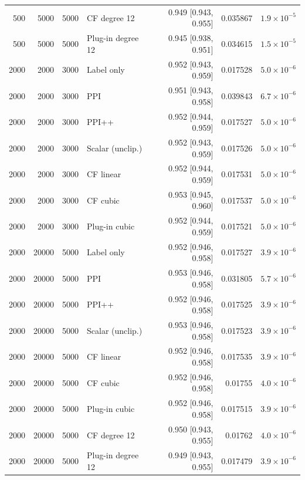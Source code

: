 {\begin{longtable}{rrrlrrr}
500 & 5000 & 5000 & CF degree 12 & 0.949 [0.943, 0.955] & 0.035867 & $1.9\times 10^{-5}$ \\
500 & 5000 & 5000 & Plug-in degree 12 & 0.945 [0.938, 0.951] & 0.034615 & $1.5\times 10^{-5}$ \\
2000 & 2000 & 3000 & Label only & 0.952 [0.943, 0.959] & 0.017528 & $5.0\times 10^{-6}$ \\
2000 & 2000 & 3000 & PPI & 0.951 [0.943, 0.958] & 0.039843 & $6.7\times 10^{-6}$ \\
2000 & 2000 & 3000 & PPI++ & 0.952 [0.944, 0.959] & 0.017527 & $5.0\times 10^{-6}$ \\
2000 & 2000 & 3000 & Scalar (unclip.) & 0.952 [0.943, 0.959] & 0.017526 & $5.0\times 10^{-6}$ \\
2000 & 2000 & 3000 & CF linear & 0.952 [0.944, 0.959] & 0.017531 & $5.0\times 10^{-6}$ \\
2000 & 2000 & 3000 & CF cubic & 0.953 [0.945, 0.960] & 0.017537 & $5.0\times 10^{-6}$ \\
2000 & 2000 & 3000 & Plug-in cubic & 0.952 [0.944, 0.959] & 0.017521 & $5.0\times 10^{-6}$ \\
2000 & 20000 & 5000 & Label only & 0.952 [0.946, 0.958] & 0.017527 & $3.9\times 10^{-6}$ \\
2000 & 20000 & 5000 & PPI & 0.953 [0.946, 0.958] & 0.031805 & $5.7\times 10^{-6}$ \\
2000 & 20000 & 5000 & PPI++ & 0.952 [0.946, 0.958] & 0.017525 & $3.9\times 10^{-6}$ \\
2000 & 20000 & 5000 & Scalar (unclip.) & 0.953 [0.946, 0.958] & 0.017523 & $3.9\times 10^{-6}$ \\
2000 & 20000 & 5000 & CF linear & 0.952 [0.946, 0.958] & 0.017535 & $3.9\times 10^{-6}$ \\
2000 & 20000 & 5000 & CF cubic & 0.952 [0.946, 0.958] & 0.01755 & $4.0\times 10^{-6}$ \\
2000 & 20000 & 5000 & Plug-in cubic & 0.952 [0.946, 0.958] & 0.017515 & $3.9\times 10^{-6}$ \\
2000 & 20000 & 5000 & CF degree 12 & 0.950 [0.943, 0.955] & 0.01762 & $4.0\times 10^{-6}$ \\
2000 & 20000 & 5000 & Plug-in degree 12 & 0.949 [0.943, 0.955] & 0.017479 & $3.9\times 10^{-6}$ \\
\end{longtable}}
